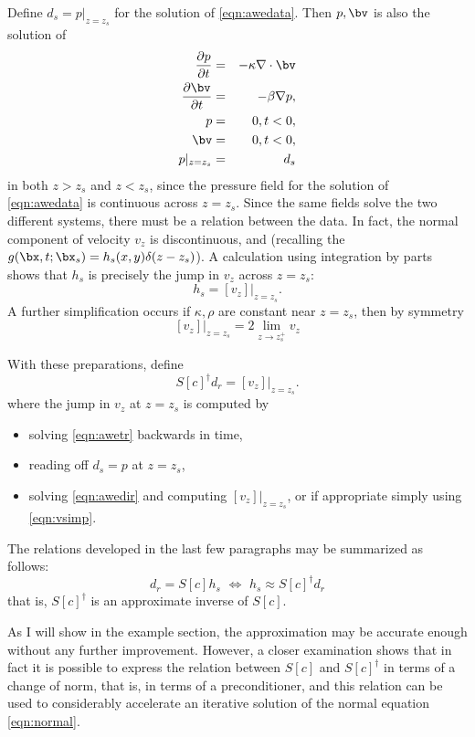 Define $d_s =p|_{z=z_s}$ for the solution of \ref{eqn:awedata}. Then $p,\bv$ is also the solution of
\begin{eqnarray}
\label{eqn:awedir}
\frac{\partial p}{\partial t} & = & - \kappa \nabla \cdot \bv \nonumber \\
\frac{\partial \bv}{\partial t} & = & - \beta \nabla p,\nonumber \\
p &=&0, t< 0,\nonumber\\
\bv &=&0,t<0,\nonumber\\
p|_{z=z_s }& = &d_s
\end{eqnarray}
in both $z>z_s$ and $z<z_s$, since the pressure field for the solution of \ref{eqn:awedata} is continuous across $z=z_s$. Since the same fields solve the two different systems, there must be a relation between the data. In fact, the normal component of velocity $v_z$ is discontinuous, and (recalling the $g(\bx,t;\bx_s) = h_s(x,y)\delta(z-z_s)$). A calculation using integration by parts shows that $h_s$ is precisely the jump in $v_z$ across $z=z_s$:
\begin{equation}
\label{eqn:vjump}
h_s = [v_z]|_{z=z_s}.
\end{equation}
A further simplification occurs if $\kappa, \rho$ are constant near $z=z_s$, then by symmetry
\begin{equation}
\label{eqn:vsimp}
[v_z]|_{z=z_s}=2 \lim_{z \rightarrow z_s^+} v_z
\end{equation}

With these preparations, define 
\begin{equation}
\label{eqn:psinv}
S[c]^{\dagger}d_r= [v_z]|_{z=z_s}.
\end{equation}
where the jump in $v_z$ at $z=z_s$ is computed by
\begin{itemize}
\item solving \ref{eqn:awetr} backwards in time,
\item reading off $d_s=p$ at $z=z_s$,
\item solving \ref{eqn:awedir} and computing $[v_z]|_{z=z_s}$, or if appropriate simply using \ref{eqn:vsimp}.
\end{itemize}
 The relations developed in the last few paragraphs may be summarized as follows:
\begin{equation}
\label{eqn:appinv}
d_r = S[c]h_s \,\,\Leftrightarrow \,\, h_s \approx S[c]^{\dagger}d_r
\end{equation}
that is, $S[c]^{\dagger}$ is an approximate inverse of $S[c]$.

As I will show in the example section, the approximation may be accurate enough without any further improvement. However, a closer examination shows that in fact it is possible to express the relation between $S[c]$ and $S[c]^{\dagger}$ in terms of a change of norm, that is, in terms of a preconditioner, and this relation can be used to considerably accelerate an iterative solution of the normal equation \ref{eqn:normal}. 

